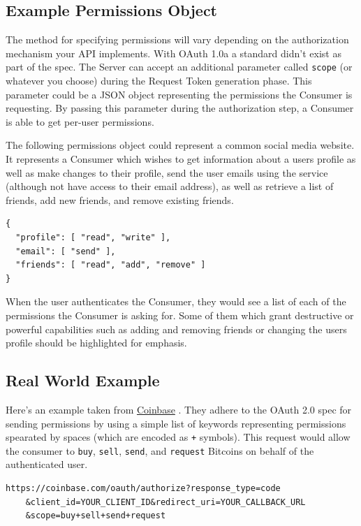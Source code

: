 \documentclass{book}
\begin{document}
\subsection{Example Permissions Object}

The method for specifying permissions will vary depending on the authorization mechanism your API implements. With OAuth 1.0a a standard didn't exist as part of the spec. The Server can accept an additional parameter called \texttt{scope} (or whatever you choose) during the Request Token generation phase. This parameter could be a JSON object representing the permissions the Consumer is requesting. By passing this parameter during the authorization step, a Consumer is able to get per-user permissions.

The following permissions object could represent a common social media website. It represents a Consumer which wishes to get information about a users profile as well as make changes to their profile, send the user emails using the service (although not have access to their email address), as well as retrieve a list of friends, add new friends, and remove existing friends.

\begin{verbatim}
{
  "profile": [ "read", "write" ],
  "email": [ "send" ],
  "friends": [ "read", "add", "remove" ]
}
\end{verbatim}

When the user authenticates the Consumer, they would see a list of each of the permissions the Consumer is asking for. Some of them which grant destructive or powerful capabilities such as adding and removing friends or changing the users profile should be highlighted for emphasis.

\subsection{Real World Example}

Here's an example taken from \href{https://coinbase.com/docs/api/authentication#permissions}{Coinbase} \cite{COINBASE}. They adhere to the OAuth 2.0 spec for sending permissions by using a simple list of keywords representing permissions spearated by spaces (which are encoded as \texttt{+} symbols). This request would allow the consumer to \texttt{buy}, \texttt{sell}, \texttt{send}, and \texttt{request} Bitcoins on behalf of the authenticated user.

\begin{verbatim}
https://coinbase.com/oauth/authorize?response_type=code
    &client_id=YOUR_CLIENT_ID&redirect_uri=YOUR_CALLBACK_URL
    &scope=buy+sell+send+request
\end{verbatim}
\end{document}

